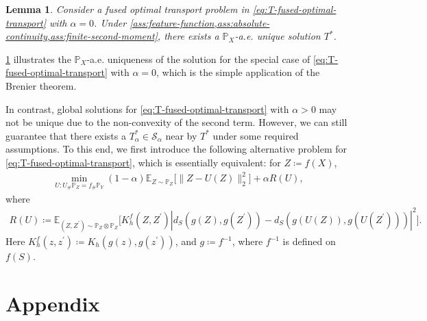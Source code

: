 \documentclass{article}
\newtheorem{lemma}{Lemma}
\begin{document}
\begin{lemma}
	\label{lem:brenier-theorem}
	Consider a fused optimal transport problem in \eqref{eq:T-fused-optimal-transport} with $\alpha = 0$. Under \cref{ass:feature-function,ass:absolute-continuity,ass:finite-second-moment}, there exists a $\mathbb{P}_X$-a.e. unique solution $T^\ast$.
\end{lemma}
\cref{lem:brenier-theorem} illustrates the $\mathbb{P}_X$-a.e. uniqueness of the solution for the special case of \eqref{eq:T-fused-optimal-transport} with $\alpha = 0$, which is the simple application of the Brenier theorem.

In contrast, global solutions for \eqref{eq:T-fused-optimal-transport} with $\alpha > 0$ may not be unique due to the non-convexity of the second term. However, we can still guarantee that there exists a $T^\ast_\alpha \in \mathcal{S}_\alpha$ near by $T^\ast$ under some required assumptions. To this end, we first introduce the following alternative problem for \eqref{eq:T-fused-optimal-transport}, which is essentially equivalent: for $Z \coloneqq f(X)$,
\begin{align}
	\label{eq:U-fused-optimal-transport}
	\min_{U: U_{\#}\mathbb{P}_Z = f_{\#}\mathbb{P}_Y} (1-\alpha)\mathbb{E}_{Z \sim \mathbb{P}_Z} \Big[ \| Z - U(Z) \|_2^2 \Big] + \alpha R(U) ,
\end{align}
where
\begin{align}
	\label{eq:U-risk}
	R(U) \coloneqq \mathbb{E}_{(Z,Z^\prime) \sim \mathbb{P}_Z \otimes \mathbb{P}_Z}\Big[K_h^f(Z,Z^\prime)\left\vert d_S(g(Z),g(Z^\prime)) - d_S(g(U(Z)),g(U(Z^\prime))) \right\vert^2\Big] .
\end{align}
Here $K_h^f(z,z^\prime) \coloneqq K_h(g(z),g(z^\prime))$, and $g \coloneqq f^{-1}$, where $f^{-1}$ is defined on $f(S)$.
	




\appendix
\section{Appendix}
\end{document}
